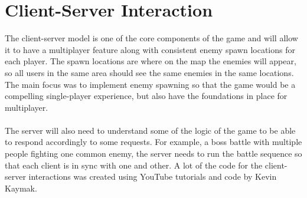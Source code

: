 \documentclass[a4paper]{report}
\begin{document}
\section{Client-Server Interaction}
The client-server model is one of the core components of the game and will allow it to have a  multiplayer feature along with consistent enemy spawn locations for each player. The spawn locations are where on the map the enemies will appear, so all users in the same area should see the same enemies in the same locations. The main focus was to implement enemy spawning so that the game would be a compelling single-player experience, but also have the foundations in place for multiplayer.
\\\\
The server will also need to understand some of the logic of the game to be able to respond accordingly to some requests. For example, a boss battle with multiple people fighting one common enemy, the server needs to run the battle sequence so that each client is in sync with one and other. A lot of the code for the client-server interactions was created using YouTube tutorials and code by Kevin Kaymak. \cite{Kaymak}
\end{document}
